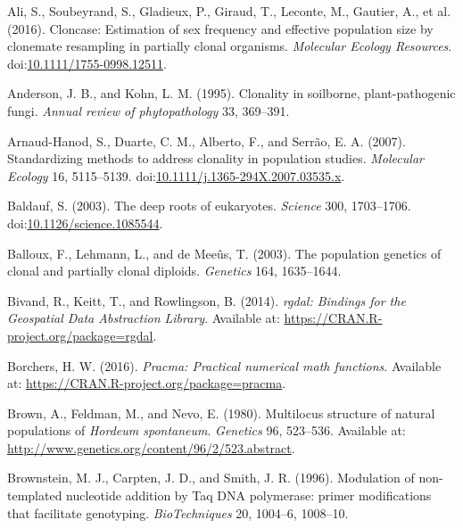 \documentclass[double,12pt]{beavtex}
\begin{document}
  \hypertarget{ref-ali2016cloncase}{}
  Ali, S., Soubeyrand, S., Gladieux, P., Giraud, T., Leconte, M., Gautier,
  A., et al. (2016). Cloncase: Estimation of sex frequency and effective
  population size by clonemate resampling in partially clonal organisms.
  \emph{Molecular Ecology Resources}.
  doi:\href{https://doi.org/10.1111/1755-0998.12511}{10.1111/1755-0998.12511}.
  
  \hypertarget{ref-anderson1995clonality}{}
  Anderson, J. B., and Kohn, L. M. (1995). Clonality in soilborne,
  plant-pathogenic fungi. \emph{Annual review of phytopathology} 33,
  369--391.
  
  \hypertarget{ref-arnaud2007standardizing}{}
  Arnaud-Hanod, S., Duarte, C. M., Alberto, F., and Serrão, E. A. (2007).
  Standardizing methods to address clonality in population studies.
  \emph{Molecular Ecology} 16, 5115--5139.
  doi:\href{https://doi.org/10.1111/j.1365-294X.2007.03535.x}{10.1111/j.1365-294X.2007.03535.x}.
  
  \hypertarget{ref-baldauf2003deep}{}
  Baldauf, S. (2003). The deep roots of eukaryotes. \emph{Science} 300,
  1703--1706.
  doi:\href{https://doi.org/10.1126/science.1085544}{10.1126/science.1085544}.
  
  \hypertarget{ref-balloux2003population}{}
  Balloux, F., Lehmann, L., and de Meeûs, T. (2003). The population
  genetics of clonal and partially clonal diploids. \emph{Genetics} 164,
  1635--1644.
  
  \hypertarget{ref-bivand2014rgdal}{}
  Bivand, R., Keitt, T., and Rowlingson, B. (2014). \emph{rgdal: Bindings
  for the Geospatial Data Abstraction Library}. Available at:
  \url{https://CRAN.R-project.org/package=rgdal}.
  
  \hypertarget{ref-borchers2016pracma}{}
  Borchers, H. W. (2016). \emph{Pracma: Practical numerical math
  functions}. Available at:
  \url{https://CRAN.R-project.org/package=pracma}.
  
  \hypertarget{ref-brown1980multilocus}{}
  Brown, A., Feldman, M., and Nevo, E. (1980). Multilocus structure of
  natural populations of \emph{Hordeum spontaneum}. \emph{Genetics} 96,
  523--536. Available at:
  \url{http://www.genetics.org/content/96/2/523.abstract}.
  
  \hypertarget{ref-brownstein1996modulation}{}
  Brownstein, M. J., Carpten, J. D., and Smith, J. R. (1996). Modulation
  of non-templated nucleotide addition by Taq DNA polymerase: primer
  modifications that facilitate genotyping. \emph{BioTechniques} 20,
  1004--6, 1008--10.
  
\end{document}
